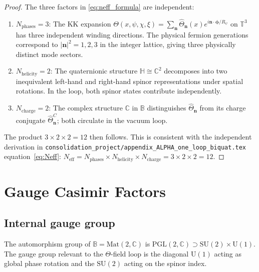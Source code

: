 \documentclass[11pt,a4paper]{article}
\begin{document}
\begin{proof}
  The three factors in \eqref{eq:neff_formula} are independent:
  \begin{enumerate}
    \item \emph{$N_{\mathrm{phases}} = 3$}: The KK expansion
      $\Theta(x,\psi,\chi,\xi) = \sum_\mathbf{n} \hat\Theta_\mathbf{n}(x)
      e^{i\mathbf{n}\cdot\boldsymbol{\phi}/R_\psi}$ on $\mathbb{T}^3$ has
      three independent winding directions.  The physical fermion generations
      correspond to $|\mathbf{n}|^2 = 1,2,3$ in the integer lattice, giving
      three physically distinct mode sectors.
      
    \item \emph{$N_{\mathrm{helicity}} = 2$}: The quaternionic structure
      $\mathbb{H}\cong\mathbb{C}^2$ decomposes into two inequivalent
      left-hand and right-hand spinor representations under spatial rotations.
      In the loop, both spinor states contribute independently.
      
    \item \emph{$N_{\mathrm{charge}} = 2$}: The complex structure
      $\mathbb{C}$ in $\mathbb{B}$ distinguishes $\hat\Theta_\mathbf{n}$
      from its charge conjugate $\hat\Theta_\mathbf{n}^C$; both circulate in
      the vacuum loop.
  \end{enumerate}
  The product $3\times 2\times 2 = 12$ then follows.
  This is consistent with the independent derivation in
  \texttt{consolidation\_project/appendix\_ALPHA\_one\_loop\_biquat.tex}
  equation~\eqref{eq:Neff}: $N_{\mathrm{eff}} = N_{\mathrm{phases}}\times
  N_{\mathrm{helicity}}\times N_{\mathrm{charge}} = 3\times 2\times 2=12$.
\end{proof}

\section{Gauge Casimir Factors}
\label{sec:casimir}

\subsection{Internal gauge group}

The automorphism group of $\mathbb{B}=\mathrm{Mat}(2,\mathbb{C})$ is
$\mathrm{PGL}(2,\mathbb{C})\supset\mathrm{SU}(2)\times\mathrm{U}(1)$.
The gauge group relevant to the $\Theta$-field loop is the diagonal
$\mathrm{U}(1)$ acting as global phase rotation and the $\mathrm{SU}(2)$
acting on the spinor index.
\end{document}
